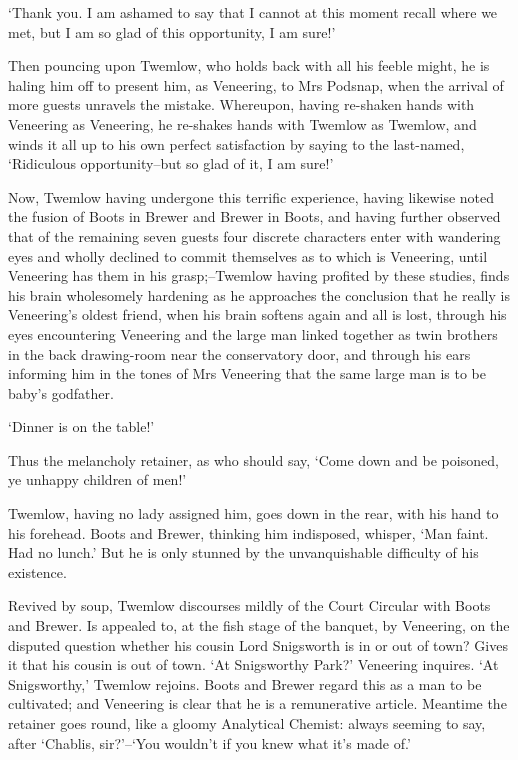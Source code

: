 ‘Thank you. I am ashamed to say that I cannot at this moment recall
where we met, but I am so glad of this opportunity, I am sure!’

Then pouncing upon Twemlow, who holds back with all his feeble might, he
is haling him off to present him, as Veneering, to Mrs Podsnap, when the
arrival of more guests unravels the mistake. Whereupon, having re-shaken
hands with Veneering as Veneering, he re-shakes hands with Twemlow as
Twemlow, and winds it all up to his own perfect satisfaction by saying
to the last-named, ‘Ridiculous opportunity--but so glad of it, I am
sure!’

Now, Twemlow having undergone this terrific experience, having likewise
noted the fusion of Boots in Brewer and Brewer in Boots, and having
further observed that of the remaining seven guests four discrete
characters enter with wandering eyes and wholly declined to commit
themselves as to which is Veneering, until Veneering has them in his
grasp;--Twemlow having profited by these studies, finds his brain
wholesomely hardening as he approaches the conclusion that he really is
Veneering’s oldest friend, when his brain softens again and all is
lost, through his eyes encountering Veneering and the large man linked
together as twin brothers in the back drawing-room near the conservatory
door, and through his ears informing him in the tones of Mrs Veneering
that the same large man is to be baby’s godfather.

‘Dinner is on the table!’

Thus the melancholy retainer, as who should say, ‘Come down and be
poisoned, ye unhappy children of men!’

Twemlow, having no lady assigned him, goes down in the rear, with
his hand to his forehead. Boots and Brewer, thinking him indisposed,
whisper, ‘Man faint. Had no lunch.’ But he is only stunned by the
unvanquishable difficulty of his existence.

Revived by soup, Twemlow discourses mildly of the Court Circular with
Boots and Brewer. Is appealed to, at the fish stage of the banquet, by
Veneering, on the disputed question whether his cousin Lord Snigsworth
is in or out of town? Gives it that his cousin is out of town. ‘At
Snigsworthy Park?’ Veneering inquires. ‘At Snigsworthy,’ Twemlow
rejoins. Boots and Brewer regard this as a man to be cultivated; and
Veneering is clear that he is a remunerative article. Meantime the
retainer goes round, like a gloomy Analytical Chemist: always seeming
to say, after ‘Chablis, sir?’--‘You wouldn’t if you knew what it’s made
of.’

